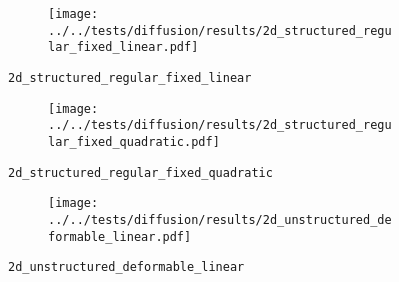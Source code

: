 %
%
\begin{frame}{}
  \vspace*{-0.2cm}
  \begin{figure}[h!]
    \begin{subfigure}[t]{0.5\textwidth}%
      \centering  
    \end{subfigure} 
    \begin{subfigure}[t]{0.48\textwidth}%
      \centering%
      \texttt{[image: ../../tests/diffusion/results/2d\_structured\_regular\_fixed\_linear.pdf]}%
    \end{subfigure}%
    \caption{\lstinline{2d_structured_regular_fixed_linear}}
  \end{figure}
\end{frame}
%
%
\begin{frame}{}
  \vspace*{-0.2cm}
  \begin{figure}[h!]
    \begin{subfigure}[t]{0.5\textwidth}%
    \centering
    \end{subfigure}
    \begin{subfigure}[t]{0.48\textwidth}%
      \centering%
      \texttt{[image: ../../tests/diffusion/results/2d\_structured\_regular\_fixed\_quadratic.pdf]}%
    \end{subfigure}%
    \caption{\lstinline{2d_structured_regular_fixed_quadratic}}
  \end{figure} 
\end{frame}
%
%
\begin{frame}{}
  \vspace*{-0.2cm}
  \begin{figure}[h!]
    \begin{subfigure}[t]{0.5\textwidth}%
    \centering
    \end{subfigure}
    \begin{subfigure}[t]{0.48\textwidth}%
      \centering%
      \texttt{[image: ../../tests/diffusion/results/2d\_unstructured\_deformable\_linear.pdf]}%
    \end{subfigure}%
    \caption{\lstinline{2d_unstructured_deformable_linear}}
  \end{figure}
\end{frame}
%
